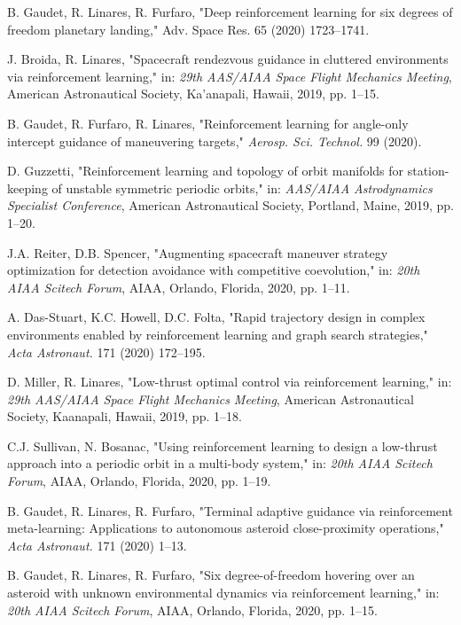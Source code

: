 \documentclass[a4paper]{article}
\begin{document}
\begin{thebibliography}{1}
		B. Gaudet, R. Linares, R. Furfaro,
		"Deep reinforcement learning for six degrees of freedom planetary landing,"
		Adv. Space Res. 65 (2020) 1723–1741.
		
		J. Broida, R. Linares,
		"Spacecraft rendezvous guidance in cluttered environments via reinforcement learning,"
		in: \textit{29th AAS/AIAA Space Flight Mechanics Meeting}, American Astronautical Society, Ka’anapali, Hawaii, 2019, pp. 1–15.
		
		B. Gaudet, R. Furfaro, R. Linares,
		"Reinforcement learning for angle-only intercept guidance of maneuvering targets,"
		\textit{Aerosp. Sci. Technol.} 99 (2020).
		
		D. Guzzetti,
		"Reinforcement learning and topology of orbit manifolds for station-keeping of unstable symmetric periodic orbits,"
		in: \textit{AAS/AIAA Astrodynamics Specialist Conference}, American Astronautical Society, Portland, Maine, 2019, pp. 1–20.
		
		J.A. Reiter, D.B. Spencer,
		"Augmenting spacecraft maneuver strategy optimization for detection avoidance with competitive coevolution,"
		in: \textit{20th AIAA Scitech Forum}, AIAA, Orlando, Florida, 2020, pp. 1–11.
		
		A. Das-Stuart, K.C. Howell, D.C. Folta,
		"Rapid trajectory design in complex environments enabled by reinforcement learning and graph search strategies,"
		\textit{Acta Astronaut.} 171 (2020) 172–195.
		
		D. Miller, R. Linares,
		"Low-thrust optimal control via reinforcement learning,"
		in: \textit{29th AAS/AIAA Space Flight Mechanics Meeting}, American Astronautical Society, Kaanapali, Hawaii, 2019, pp. 1–18.
		
		C.J. Sullivan, N. Bosanac,
		"Using reinforcement learning to design a low-thrust approach into a periodic orbit in a multi-body system,"
		in: \textit{20th AIAA Scitech Forum}, AIAA, Orlando, Florida, 2020, pp. 1–19.
		
		
		B. Gaudet, R. Linares, R. Furfaro,
		"Terminal adaptive guidance via reinforcement meta-learning: Applications to autonomous asteroid close-proximity operations,"
		\textit{Acta Astronaut.} 171 (2020) 1–13.
		
		
		B. Gaudet, R. Linares, R. Furfaro,
		"Six degree-of-freedom hovering over an asteroid with unknown environmental dynamics via reinforcement learning,"
		in: \textit{20th AIAA Scitech Forum}, AIAA, Orlando, Florida, 2020, pp. 1–15.
		

\end{thebibliography}
\end{document}
